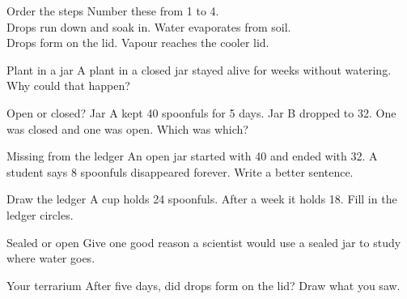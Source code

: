 \begin{puzzle}{Order the steps}
Number these from 1 to 4. \\
\wline[1cm] Drops run down and soak in. \quad \wline[1cm] Water evaporates from soil.\\
\wline[1cm] Drops form on the lid. \quad \wline[1cm] Vapour reaches the cooler lid.
\end{puzzle}

\begin{puzzle}{Plant in a jar}
A plant in a closed jar stayed alive for weeks without watering. Why could that happen? \wline[6cm]
\end{puzzle}

\clearpage

\begin{puzzle}{Open or closed?}
Jar A kept 40 spoonfuls for 5 days. Jar B dropped to 32. One was closed and one was open. Which was which? \wline[4cm]
\end{puzzle}

\begin{puzzle}{Missing from the ledger}
An open jar started with 40 and ended with 32. A student says 8 spoonfuls disappeared forever. Write a better sentence. \wline[6cm]
\end{puzzle}

\begin{puzzle}{Draw the ledger}
A cup holds 24 spoonfuls. After a week it holds 18. Fill in the ledger circles.
\begin{center}
\end{center}
\end{puzzle}

\begin{puzzle}{Sealed or open}
Give one good reason a scientist would use a sealed jar to study where water goes. \wline[6cm]
\end{puzzle}

\begin{puzzle}{Your terrarium}
After five days, did drops form on the lid? Draw what you saw. \wline[6cm]
\end{puzzle}
\clearpage
